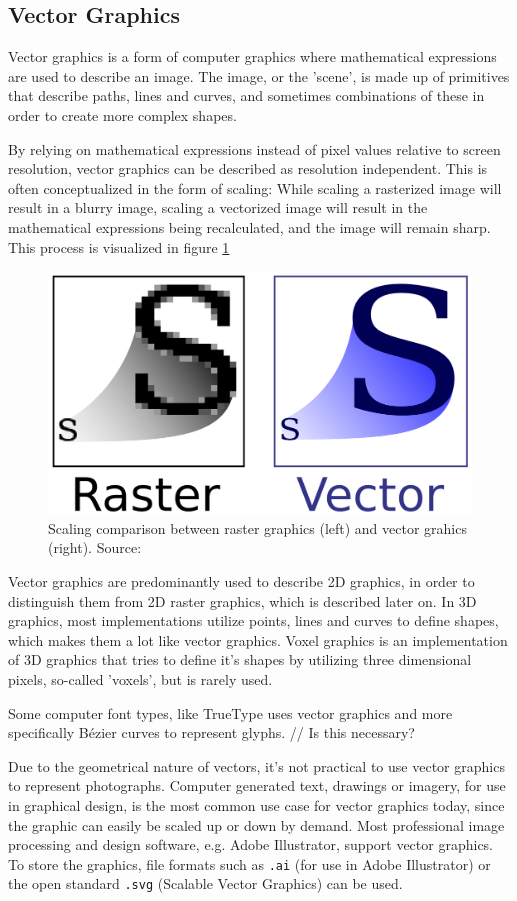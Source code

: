 \subsection{Vector Graphics}
Vector graphics is a form of computer graphics where mathematical expressions are used to describe an image. The image, or the 'scene', is made up of primitives that describe paths, lines and curves, and sometimes combinations of these in order to create more complex shapes.

By relying on mathematical expressions instead of pixel values relative to screen resolution, vector graphics can be described as resolution independent. This is often conceptualized in the form of scaling: While scaling a rasterized image will result in a blurry image, scaling a vectorized image will result in the mathematical expressions being recalculated, and the image will remain sharp. This process is visualized in figure \ref{fig:vectorscaling}

\begin{figure}[h!]
\centering \includegraphics[width=0.5\linewidth]{images/bm_vs_svg.png}
\caption{Scaling comparison between raster graphics (left) and vector grahics (right). Source: \cite{svg}}
\label{fig:vectorscaling}
\end{figure}

Vector graphics are predominantly used to describe 2D graphics, in order to distinguish them from 2D raster graphics, which is described later on. In 3D graphics, most implementations utilize points, lines and curves to define shapes, which makes them a lot like vector graphics. Voxel graphics is an implementation of 3D graphics that tries to define it's shapes by utilizing three dimensional pixels, so-called 'voxels', but is rarely used.

Some computer font types, like TrueType uses vector graphics and more specifically Bézier curves to represent glyphs\cite{truetype}. // Is this necessary?

Due to the geometrical nature of vectors, it's not practical to use vector graphics to represent photographs. Computer generated text, drawings or imagery, for use in graphical design, is the most common use case for vector graphics today, since the graphic can easily be scaled up or down by demand. Most professional image processing and design software, e.g. Adobe Illustrator, support vector graphics. To store the graphics, file formats such as \texttt{.ai} (for use in Adobe Illustrator) or the open standard \texttt{.svg} (Scalable Vector Graphics) can be used.
